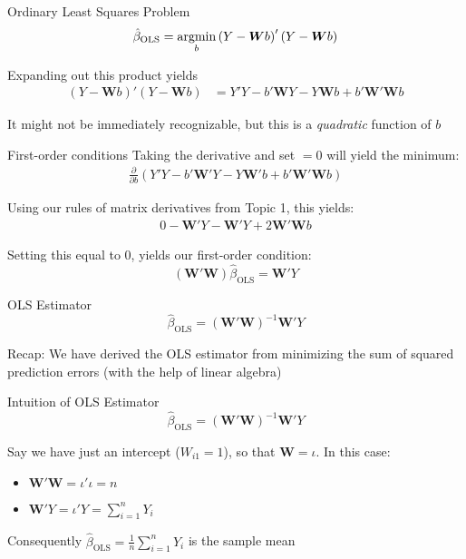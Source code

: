 \documentclass[aspectratio=169,t,11pt,table]{beamer}
\begin{document}
\begin{frame}{Ordinary Least Squares Problem}
  \vspace*{-\bigskipamount}
  $$
    \hat{\beta}_{\text{OLS}} 
    = \operatorname*{argmin}_b  \left(Y - \bm{W} b \right)' \left( Y - \bm{W} b \right)
  $$

  \bigskip
  Expanding out this product yields
  \begin{align*}
    \left(Y - \bm{W} b \right)' \left( Y - \bm{W} b \right) 
    &= 
    Y' Y - b' \bm{W} Y - Y \bm{W} b + b' \bm{W}' \bm{W} b
  \end{align*}

  \bigskip
  It might not be immediately recognizable, but this is a \emph{quadratic} function of $b$ 
\end{frame}

\begin{frame}{First-order conditions}
  Taking the derivative and set $= 0$ will yield the minimum:
  \begin{align*}
    \frac{\partial}{\partial b} \left( Y' Y - b' \bm{W}' Y - Y \bm{W}' b + b' \bm{W}' \bm{W} b \right)
  \end{align*}

  \pause
  \bigskip
  Using our rules of matrix derivatives from Topic 1, this yields:
  \begin{align*}
    0 - \bm{W}' Y - \bm{W}' Y + 2 \bm{W}' \bm{W} b 
  \end{align*}

  \pause
  \bigskip
  Setting this equal to 0, yields our first-order condition:
  $$
    \left(\bm{W}' \bm{W} \right) \hat{\beta}_{\text{OLS}} = \bm{W}' Y
  $$
\end{frame}

\begin{frame}{OLS Estimator}
  \vspace*{-\bigskipamount}
  $$
    \hat{\beta}_{\text{OLS}} = \left(\bm{W}' \bm{W} \right)^{-1} \bm{W}' Y
  $$

  \bigskip
  {\color{orange} Recap:} We have derived the OLS estimator from minimizing the sum of squared prediction errors (with the help of linear algebra)
\end{frame}

\begin{frame}{Intuition of OLS Estimator}
  \vspace*{-\bigskipamount}
  $$
    \hat{\beta}_{\text{OLS}} = \left(\bm{W}' \bm{W} \right)^{-1} \bm{W}' Y
  $$

  Say we have just an intercept ($W_{i1} = 1$), so that $\bm{W} = \iota$. In this case:

  \begin{itemize}
    \item $\bm{W}' \bm{W} = \iota' \iota = n$ 
    
    \item $\bm{W}' Y = \iota' Y = \sum_{i=1}^n Y_i$
  \end{itemize}

  \bigskip
  Consequently $\hat{\beta}_{\text{OLS}} = \frac{1}{n} \sum_{i=1}^n Y_i$ is the sample mean
\end{frame}
\end{document}
